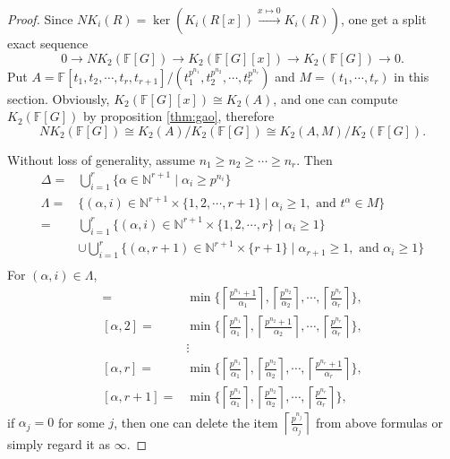 \begin{proof}
Since $NK_i(R)=\ker(K_i(R[x])\overset{x\mapsto 0}\longrightarrow K_i(R))$, one get a split exact sequence
\[0\longrightarrow NK_2(\mathbb{F}[G]) \longrightarrow K_2(\mathbb{F}[G][x])\longrightarrow K_2(\mathbb{F}[G]) \longrightarrow 0.\]
Put $A=\mathbb{F}[t_1,t_2,\cdots,t_r,t_{r+1}]/(t_1^{p^{n_1}},t_2^{p^{n_2}},\cdots,t_r^{p^{n_r}})$ and $M=(t_1,\cdots,t_r)$ in this section. Obviously, $K_2(\mathbb{F}[G][x])\cong K_2(A)$, and one can compute $K_2(\mathbb{F}[G])$ by proposition \ref{thm:gao}, therefore
\[NK_2(\mathbb{F}[G])\cong K_2(A)/K_2(\mathbb{F}[G]) \cong K_2(A,M)/K_2(\mathbb{F}[G]).\]

Without loss of generality, assume $n_1\geq n_2\geq \cdots \geq n_r$. Then 
\begin{align*}
\Delta =&\bigcup_{i=1}^r\{\alpha \in\mathbb{N}^{r+1}\mid  \alpha_i \geq p^{n_i}\}\\
\Lambda =&\{(\alpha ,i)\in\mathbb{N}^{r+1} \times \{1,2,\cdots,r+1\}\mid \alpha_i\geq 1, \text{ and } t^{\alpha}\in M\} \\
	=&\bigcup_{i=1}^r\{(\alpha ,i)\in\mathbb{N}^{r+1} \times \{1,2,\cdots,r\}\mid \alpha_i\geq 1\}  \\
	&\cup \bigcup_{i=1}^r\{(\alpha ,r+1)\in\mathbb{N}^{r+1} \times \{r+1\}\mid \alpha_{r+1}\geq 1, \text{ and } \alpha_i\geq 1\}\\
\end{align*}
For $(\alpha,i)\in \Lambda$, 
\begin{align*}
[\alpha,1]=&\min\{\left \lceil \frac{p^{n_1}+1}{\alpha_1} \right \rceil,\left \lceil \frac{p^{n_2}}{\alpha_2} \right \rceil,\cdots,\left \lceil \frac{p^{n_r}}{\alpha_r} \right \rceil\}, \\
[\alpha,2]=&\min\{\left \lceil \frac{p^{n_1}}{\alpha_1} \right \rceil,\left \lceil \frac{p^{n_2}+1}{\alpha_2} \right \rceil,\cdots,\left \lceil \frac{p^{n_r}}{\alpha_r} \right \rceil\}, \\
&\vdots\\
[\alpha,r]=&\min\{\left \lceil \frac{p^{n_1}}{\alpha_1} \right \rceil,\left \lceil \frac{p^{n_2}}{\alpha_2} \right \rceil,\cdots,\left \lceil \frac{p^{n_r}+1}{\alpha_r} \right \rceil\}, \\
[\alpha,r+1]=&\min\{\left \lceil \frac{p^{n_1}}{\alpha_1} \right \rceil,\left \lceil \frac{p^{n_2}}{\alpha_2} \right \rceil,\cdots,\left \lceil \frac{p^{n_r}}{\alpha_r} \right \rceil\}, 
\end{align*}
if $\alpha_j=0$ for some $j$, then one can delete the item $\left \lceil \frac{p^{n_j}}{\alpha_j} \right \rceil$ from above formulas or simply regard it as $\infty$.


\end{proof}
